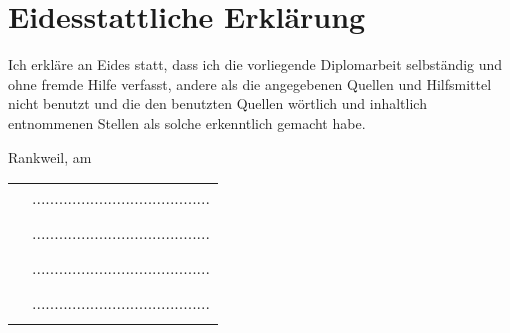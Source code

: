 \section*{Eidesstattliche Erklärung}
Ich erkläre an Eides statt, dass ich die vorliegende Diplomarbeit selbständig und ohne fremde
Hilfe verfasst, andere als die angegebenen Quellen und Hilfsmittel nicht benutzt und die den
benutzten Quellen wörtlich und inhaltlich entnommenen Stellen als solche erkenntlich
gemacht habe.

\vspace{0.3cm}
\par Rankweil, am \PrintDate
\linebreak
\linebreak
\begin{tabular}{p{7cm}C{5cm}}
	& ........................................ \\[-1em]
	& \emplA \\ [1.5em]
	& ........................................ \\[-1em]
	& \emplB \\ [1.5em]
	& ........................................ \\[-1em]
	& \emplC \\ [1.5em]
	& ........................................ \\[-1em]
	& \emplD \\ [1.5em]
\end{tabular}

